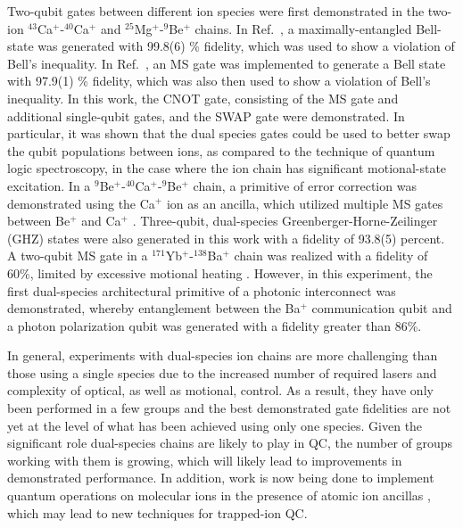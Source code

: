 \documentclass[%
12pt,
 amsmath,amssymb,
]{revtex4-2}
\begin{document}
Two-qubit gates between different ion species were first demonstrated in the two-ion $^{43}$Ca$^+$-$^{40}$Ca$^+$ \cite{BallanceHybridLogic2015} and $^{25}$Mg$^+$-$^9$Be$^+$ \cite{TanMultiElement2015} chains.  In Ref.~\cite{BallanceHybridLogic2015}, a maximally-entangled Bell-state was generated with 99.8(6) \% fidelity, which was used to show a violation of Bell's inequality.  In Ref.~\cite{TanMultiElement2015}, an MS gate was implemented to generate a Bell state with 97.9(1) \% fidelity, which was also then used to show a violation of Bell's inequality.  In this work, the CNOT gate, consisting of the MS gate and additional single-qubit gates, and the SWAP gate were demonstrated.  In particular, it was shown that the dual species gates could be used to better swap the qubit populations between ions, as compared to the technique of quantum logic spectroscopy, in the case where the ion chain has significant motional-state excitation.  In a $^{9}$Be$^+$-$^{40}$Ca$^+$-$^{9}$Be$^+$ chain, a primitive of error correction was demonstrated using the Ca$^+$ ion as an ancilla, which utilized multiple MS gates between Be$^+$ and Ca$^+$ \cite{NegnevitskyMultiReadout2018}.  Three-qubit, dual-species Greenberger-Horne-Zeilinger (GHZ) states were also generated in this work with a fidelity of 93.8(5) percent.  A two-qubit MS gate in a  $^{171}$Yb$^+$-$^{138}$Ba$^+$ chain was realized with a fidelity of 60\%, limited by excessive motional heating \cite{InlekMultiNode2017}.  However, in this experiment, the first dual-species architectural primitive of a photonic interconnect was demonstrated, whereby entanglement between the Ba$^+$ communication qubit and a photon polarization qubit was generated with a fidelity greater than 86\%.

In general, experiments with dual-species ion chains are more challenging than those using a single species due to the increased number of required lasers and complexity of optical, as well as motional, control.  As a result, they have only been performed in a few groups and the best demonstrated gate fidelities are not yet at the level of what has been achieved using only one species.  Given the significant role dual-species chains are likely to play in QC, the number of groups working with them is growing, which will likely lead to improvements in demonstrated performance.  In addition, work is now being done to implement quantum operations on molecular ions in the presence of atomic ion ancillas \cite{ChouMolecularIon2017, HudsonMolecularQC2018}, which may lead to new techniques for trapped-ion QC.
\end{document}
